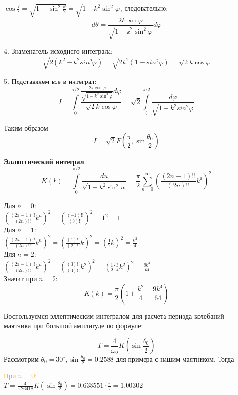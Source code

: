 \documentclass[aspectratio=169]{beamer}
\begin{document}
	\(\cos\frac{\theta}{2}=\sqrt{1-\sin^2\frac{\theta}{2}}=\sqrt{1-k^2\sin^2\varphi}\), следовательно:
	\[d\theta=\frac{2k\cos\varphi}{\sqrt{1-k^2\sin^2\varphi}}d\varphi\]
	\newpage
	
	4. Знаменатель исходного интеграла:
	\[\sqrt{2(k^2-k^2sin^2\varphi)}=\sqrt{2k^2(1-sin^2\varphi)}=\sqrt{2}k \cos\varphi\]
	
	5. Подставляем все в интеграл:
	\[I=\int\limits_0^{\pi/2}\frac{\frac{2k \cos\varphi}{\sqrt{1-k^2\sin^2\varphi}}d\varphi}{\sqrt{2}k \cos\varphi}=\sqrt{2}\int\limits_0^{\pi/2}\frac{d\varphi}{\sqrt{1-k^2sin^2\varphi}}\]
	
	Таким образом \[I=\sqrt{2}F\left(\frac{\pi}{2},\sin\frac{\theta_0}{2}\right)\]
	
	\newpage
	
	\large \textbf{\textcolor{structure.fg}{Эллиптический интеграл}}\\
	
	\[K(k)=\int\limits_0^{\pi/2}\frac{du}{\sqrt{1-k^2\sin^2{u}}}=
	\frac{\pi}{2}\sum\limits_{n=0}^{\infty}\left(\frac{(2n-1)!!}{(2n)!!}k^n\right)^2\]
	
	Для \(n=0\):\\
	\(\left(\frac{(2n-1)!!}{(2n)!!}k^n\right)^2=\left(\frac{(-1)!!}{(0)!!}\right)^2=1^2=1\)\\
	
	Для \(n=1\):\\
	\(\left(\frac{(2n-1)!!}{(2n)!!}k^n\right)^2=
	\left(\frac{(1)!!}{(2)!!}k\right)^2=\left(\frac{1}{2}k\right)^2=\frac{k^2}{4}\)\\
	
	Для \(n=2\):\\
	\(\left(\frac{(2n-1)!!}{(2n)!!}k^n\right)^2=
	\left(\frac{(3)!!}{(4)!!}k^2\right)^2=
	\left(\frac{1 \cdot 3}{2 \cdot 4}k^2\right)^2=\frac{9k^4}{64}\)\\
	
	Значит при \(n=2\):\\
	\[K(k)=\frac{\pi}{2}\left(1+\frac{k^2}{4}+\frac{9k^4}{64}\right)\]
	
	\newpage
	
	Воспользуемся эллептическим интегралом для расчета периода колебаний маятника при большой амплитуде по формуле:
	
	\[T=\frac{4}{\omega _{0}}K\left(\sin \frac{\theta _{0}}{2}\right)\]
	Рассмотрим \(\theta_0 = 30^{\circ}, \sin{\frac{\theta_0}{2}=0.2588}\) для примера с нашим маятником. Тогда 
	
	\textcolor{orange}{При \(n=0\):}\\
	\(T=\frac{4}{6.26418}K\left(\sin \frac{\theta_{0}}{2}\right)=
	0.638551 \cdot \frac{\pi}{2}=1.00302\)\\[0.5cm]
	
\end{document}
